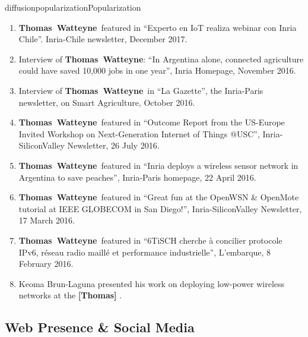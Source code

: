 \documentclass{ra2016}
\newcommand{\thomas}           {\textbf{Thomas~Watteyne}}
\newcommand{\commentthomas}[1] {\textbf{[Thomas] #1}}
\begin{document}
\begin{module}{diffusion}{popularization}{Popularization}
\begin{enumerate}
    \item \thomas~featured in ``Experto en IoT realiza webinar con Inria Chile''. Inria-Chile newsletter, December 2017.
    \item Interview of \thomas: ``In Argentina alone, connected agriculture could have saved 10,000 jobs in one year'', Inria Homepage, November 2016.
    \item Interview of \thomas~in ``La Gazette'', the Inria-Paris newsletter, on Smart Agriculture, October 2016.
    \item \thomas~featured in ``Outcome Report from the US-­Europe Invited Workshop on Next-Generation Internet of Things @USC'', Inria-SiliconValley Newsletter, 26 July 2016.
    \item \thomas~featured in ``Inria deploys a wireless sensor network in Argentina to save peaches'', Inria-Paris homepage, 22 April 2016.
    \item \thomas~featured in ``Great fun at the OpenWSN \& OpenMote tutorial at IEEE GLOBECOM in San Diego!'', Inria-SiliconValley Newsletter, 17 March 2016.
    \item \thomas~featured in ``6TiSCH cherche à concilier protocole IPv6, réseau radio maillé et performance industrielle'', L'embarque, 8 February 2016.
    \item Keoma Brun-Laguna presented his work on deploying low-power wireless networks at the \commentthomas{}.
\end{enumerate}

\subsection{Web Presence \& Social Media}


\end{module}
\end{document}
